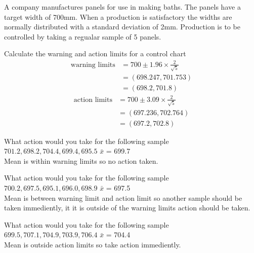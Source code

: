         \begin{example}
        {
            A company manufactures panels for use in making baths. The panels have a target width of 700mm. When a production is satisfactory the widths are normally distributed with a standard deviation of 2mm. Production is to be controlled by taking a regualar sample of 5 panels.
        }

        \begin{step}{Calculate the warning and action limits for a control chart}
        \begin{align*}
        \text{warning limits} &= 700 \pm 1.96 \times \frac{2}{\sqrt{5}}\\
        &= (698.247, 701.753)\\
        &= (698.2, 701.8)
        \end{align*}
        \begin{align*}
        \text{action limits} &= 700 \pm 3.09 \times \frac{2}{\sqrt{5}}\\
        &= (697.236, 702.764) \\
        &= (697.2, 702.8)
        \end{align*}
        \end{step}

        \begin{step}{What action would you take for the following sample $701.2, 698.2, 704.4, 699.4, 695.5$}
        $\bar{x}$ = 699.7\\
        Mean is within warning limits so no action taken.
        \end{step}

        \begin{step}{What action would you take for the following sample $700.2, 697.5, 695.1, 696.0, 698.9$}
        $\bar{x}$ = 697.5\\
        Mean is between warning limit and action limit so another sample should be taken immediently, it it is outside of the warning limits action should be taken.
        \end{step}

        \begin{step}{What action would you take for the following sample $699.5, 707.1, 704.9, 703.9, 706.4$}
        $\bar{x}$ = 704.4\\
        Mean is outside action limits so take action immediently.
        \end{step}

        \end{example}

